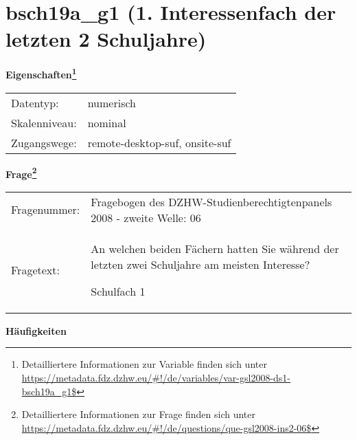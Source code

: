 
    \setcounter{footnote}{0}

    \vspace*{-1.8cm}
	\section{bsch19a\_g1 (1. Interessenfach der letzten 2 Schuljahre)}
	\label{section:bsch19a_g1}



    \vspace*{0.5cm}
    \noindent\textbf{Eigenschaften\footnote{Detailliertere Informationen zur Variable finden sich unter
		\url{https://metadata.fdz.dzhw.eu/\#!/de/variables/var-gsl2008-ds1-bsch19a_g1$}}}\\
	\begin{tabularx}{\hsize}{@{}lX}
	Datentyp: & numerisch \\
	Skalenniveau: & nominal \\
	Zugangswege: &
	  remote-desktop-suf, 
	  onsite-suf
 \\
    \end{tabularx}



				\vspace*{0.5cm}
                \noindent\textbf{Frage\footnote{Detailliertere Informationen zur Frage finden sich unter
		              \url{https://metadata.fdz.dzhw.eu/\#!/de/questions/que-gsl2008-ins2-06$}}}\\
				\begin{tabularx}{\hsize}{@{}lX}
					Fragenummer: &
					  Fragebogen des DZHW-Studienberechtigtenpanels 2008 - zweite Welle:
					  06
 \\
					Fragetext: & An welchen beiden Fächern hatten Sie während der letzten zwei Schuljahre am meisten Interesse?\par  Schulfach 1 \\
				\end{tabularx}





        		\vspace*{0.5cm}
                \noindent\textbf{Häufigkeiten}

